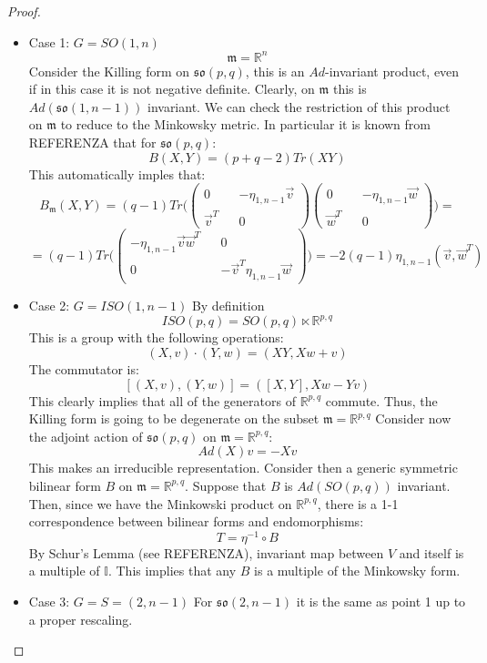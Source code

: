 \documentclass[12pt,a4paper]{report}
\theoremstyle{definition}
\theoremstyle{Theorem}
\theoremstyle{break}
\theoremstyle{definition}
\begin{document}
	\begin{proof}
		\begin{itemize}
			\item Case 1: $G=SO(1,n)$\\
			$$\mathfrak{m}=\mathbb{R}^n$$
			Consider the Killing form on $\mathfrak{so}(p,q)$, this is an $Ad$-invariant product, even if in this case it is not negative definite. Clearly, on $\mathfrak{m}$ this is $Ad(\mathfrak{so}(1,n-1))$ invariant. We can check the restriction of this product on $\mathfrak{m}$ to reduce to the Minkowsky metric. In particular it is known from REFERENZA that for $\mathfrak{so}(p,q)$:
			$$B(X,Y)=(p+q-2)Tr(XY)$$
			This automatically imples that:
			$$B_\mathfrak{m}(X,Y)=(q-1)Tr\bigg(\begin{pmatrix}
				0 && -\eta_{1,n-1}\vec{v} \\
				\vec{v}^T && 0
			\end{pmatrix}\begin{pmatrix}
			0 && -\eta_{1,n-1}\vec{w} \\
			\vec{w}^T && 0
			\end{pmatrix}\bigg)=$$
			$$=(q-1)Tr\bigg(\begin{pmatrix}
				-\eta_{1,n-1}\vec{v}\vec{w}^T && 0 \\
				0 && -\vec{v}^T\eta_{1,n-1}\vec{w}
			\end{pmatrix}\bigg)=-2(q-1)\eta_{1,n-1}(\vec{v},\vec{w}^T)$$
			\item Case 2: $G=ISO(1,n-1)$
			By definition 
			$$ISO(p,q)=SO(p,q)\ltimes \mathbb{R}^{p,q}$$
			This is a group with the following operations:
			$$(X,v)\cdot (Y,w)=(XY,Xw+v)$$
			The commutator is:			$$[(X,v),(Y,w)]=([X,Y],Xw-Yv)$$
			This clearly implies that all of the generators of $\mathbb{R}^{p,q}$ commute. Thus, the Killing form is going to be degenerate on the subset $\mathfrak{m}=\mathbb{R}^{p,q}$
			Consider now the adjoint action of $\mathfrak{so}(p,q)$ on $\mathfrak{m}=\mathbb{R}^{p,q}$:
			$$Ad(X)v=-Xv$$
			This makes an irreducible representation. Consider then a generic symmetric bilinear form $B$ on $\mathfrak{m}=\mathbb{R}^{p,q}$. Suppose that $B$ is $Ad(SO(p,q))$ invariant. Then, since we have the Minkowski product on $\mathbb{R}^{p,q}$, there is a 1-1 correspondence between bilinear forms and endomorphisms:
			$$T=\eta^{-1}\circ B$$ 
			By Schur's Lemma (see REFERENZA), invariant map between $V$ and itself is a multiple of $\mathbb{I}$. This implies that any $B$ is a multiple of the Minkowsky form.
			\item Case 3: $G=S=(2,n-1)$
			For $\mathfrak{so}(2,n-1)$ it is the same as point 1 up to a proper rescaling.
		\end{itemize}
	\end{proof}
\end{document}
